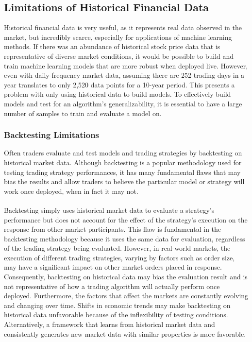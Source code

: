 \subsection{Limitations of Historical Financial Data}
Historical financial data is very useful, as it represents real data observed in the market, but incredibly scarce, especially for applications of machine learning methods. If there was an abundance of historical stock price data that is representative of diverse market conditions, it would be possible to build and train machine learning models that are more robust when deployed live. However, even with daily-frequency market data, assuming there are 252 trading days in a year translates to only 2,520 data points for a 10-year period. This presents a problem with only using historical data to build models. To effectively build models and test for an algorithm's generalizability, it is essential to have a large number of samples to train and evaluate a model on.

\subsubsection{Backtesting Limitations}
Often traders evaluate and test models and trading strategies by backtesting on historical market data. Although backtesting is a popular methodology used for testing trading strategy performances, it has many fundamental flaws that may bias the results and allow traders to believe the particular model or strategy will work once deployed, when in fact it may not.
\\
\\
Backtesting simply uses historical market data to evaluate a strategy's performance but does not account for the effect of the strategy's execution on the response from other market participants. This flaw is fundamental in the backtesting methodology because it uses the same data for evaluation, regardless of the trading strategy being evaluated. However, in real-world markets, the execution of different trading strategies, varying by factors such as order size, may have a significant impact on other market orders placed in response. Consequently, backtesting on historical data may bias the evaluation result and is not representative of how a trading algorithm will actually perform once deployed. Furthermore, the factors that affect the markets are constantly evolving and changing over time. Shifts in economic trends may make backtesting on historical data unfavorable because of the inflexibility of testing conditions. Alternatively, a framework that learns from historical market data and consistently generates new market data with similar properties is more favorable.


